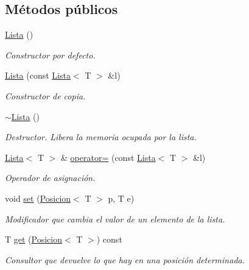\subsection*{Métodos públicos}
\begin{DoxyCompactItemize}
\item 
\mbox{\label{classLista_adce924e21607848663132290be1a959d}} 
\mbox{\hyperlink{classLista_adce924e21607848663132290be1a959d}{Lista}} ()
\begin{DoxyCompactList}\small\item\em Constructor por defecto. \end{DoxyCompactList}\item 
\mbox{\hyperlink{classLista_ac9895a302242ab2d624e054357aeb13c}{Lista}} (const \mbox{\hyperlink{classLista}{Lista}}$<$ T $>$ \&l)
\begin{DoxyCompactList}\small\item\em Constructor de copia. \end{DoxyCompactList}\item 
\mbox{\label{classLista_af297975e278b0c92cbf67d14b2f08366}} 
\mbox{\hyperlink{classLista_af297975e278b0c92cbf67d14b2f08366}{$\sim$\+Lista}} ()
\begin{DoxyCompactList}\small\item\em Destructor. Libera la memoria ocupada por la lista. \end{DoxyCompactList}\item 
\mbox{\hyperlink{classLista}{Lista}}$<$ T $>$ \& \mbox{\hyperlink{classLista_a1f2c4d3a18401f03c216b0bbb7da41fc}{operator=}} (const \mbox{\hyperlink{classLista}{Lista}}$<$ T $>$ \&l)
\begin{DoxyCompactList}\small\item\em Operador de asignación. \end{DoxyCompactList}\item 
void \mbox{\hyperlink{classLista_a7d225f26b4490809aa92bcfd44661c12}{set}} (\mbox{\hyperlink{classPosicion}{Posicion}}$<$ T $>$ p, T e)
\begin{DoxyCompactList}\small\item\em Modificador que cambia el valor de un elemento de la lista. \end{DoxyCompactList}\item 
T \mbox{\hyperlink{classLista_add1ea7959a85ded8e73f944259f04328}{get}} (\mbox{\hyperlink{classPosicion}{Posicion}}$<$ T $>$) const
\begin{DoxyCompactList}\small\item\em Consultor que devuelve lo que hay en una posición determinada. \end{DoxyCompactList}\item 

\end{DoxyCompactItemize}
